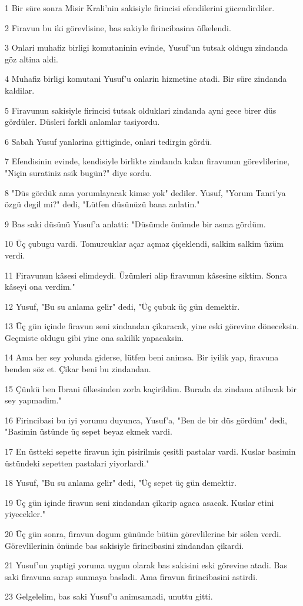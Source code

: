 \par 1 Bir süre sonra Misir Krali'nin sakisiyle firincisi efendilerini gücendirdiler.
\par 2 Firavun bu iki görevlisine, bas sakiyle firincibasina öfkelendi.
\par 3 Onlari muhafiz birligi komutaninin evinde, Yusuf'un tutsak oldugu zindanda göz altina aldi.
\par 4 Muhafiz birligi komutani Yusuf'u onlarin hizmetine atadi. Bir süre zindanda kaldilar.
\par 5 Firavunun sakisiyle firincisi tutsak olduklari zindanda ayni gece birer düs gördüler. Düsleri farkli anlamlar tasiyordu.
\par 6 Sabah Yusuf yanlarina gittiginde, onlari tedirgin gördü.
\par 7 Efendisinin evinde, kendisiyle birlikte zindanda kalan firavunun görevlilerine, "Niçin suratiniz asik bugün?" diye sordu.
\par 8 "Düs gördük ama yorumlayacak kimse yok" dediler. Yusuf, "Yorum Tanri'ya özgü degil mi?" dedi, "Lütfen düsünüzü bana anlatin."
\par 9 Bas saki düsünü Yusuf'a anlatti: "Düsümde önümde bir asma gördüm.
\par 10 Üç çubugu vardi. Tomurcuklar açar açmaz çiçeklendi, salkim salkim üzüm verdi.
\par 11 Firavunun kâsesi elimdeydi. Üzümleri alip firavunun kâsesine siktim. Sonra kâseyi ona verdim."
\par 12 Yusuf, "Bu su anlama gelir" dedi, "Üç çubuk üç gün demektir.
\par 13 Üç gün içinde firavun seni zindandan çikaracak, yine eski görevine döneceksin. Geçmiste oldugu gibi yine ona sakilik yapacaksin.
\par 14 Ama her sey yolunda giderse, lütfen beni animsa. Bir iyilik yap, firavuna benden söz et. Çikar beni bu zindandan.
\par 15 Çünkü ben Ibrani ülkesinden zorla kaçirildim. Burada da zindana atilacak bir sey yapmadim."
\par 16 Firincibasi bu iyi yorumu duyunca, Yusuf'a, "Ben de bir düs gördüm" dedi, "Basimin üstünde üç sepet beyaz ekmek vardi.
\par 17 En üstteki sepette firavun için pisirilmis çesitli pastalar vardi. Kuslar basimin üstündeki sepetten pastalari yiyorlardi."
\par 18 Yusuf, "Bu su anlama gelir" dedi, "Üç sepet üç gün demektir.
\par 19 Üç gün içinde firavun seni zindandan çikarip agaca asacak. Kuslar etini yiyecekler."
\par 20 Üç gün sonra, firavun dogum gününde bütün görevlilerine bir sölen verdi. Görevlilerinin önünde bas sakisiyle firincibasini zindandan çikardi.
\par 21 Yusuf'un yaptigi yoruma uygun olarak bas sakisini eski görevine atadi. Bas saki firavuna sarap sunmaya basladi. Ama firavun firincibasini astirdi.
\par 23 Gelgelelim, bas saki Yusuf'u animsamadi, unuttu gitti.

